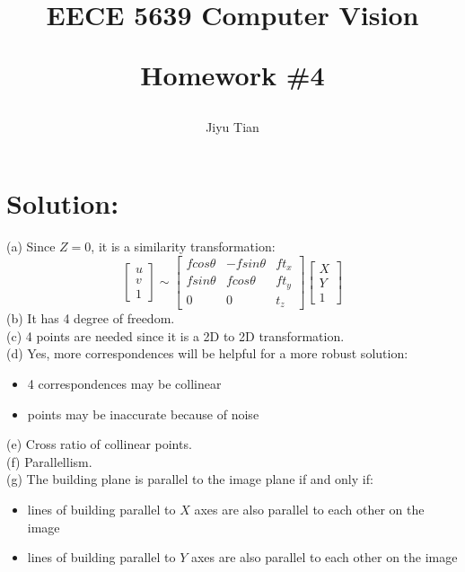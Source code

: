 \documentclass[12pt]{article}
\title{EECE 5639 Computer Vision\\ [2ex] \begin{large} Homework \#4 \end{large} }
\author{Jiyu Tian}
\date{}
\begin{document}
\maketitle
\pagestyle{empty}
\section{Solution:}
(a) Since $Z=0$, it is a similarity transformation:
\begin{equation*}
\left[ \begin{array}{c}
u\\
v\\
1
\end{array} \right] \sim \left[ \begin{array}{ccc}
fcos\theta & -fsin\theta & ft_x\\
fsin\theta & fcos\theta & ft_y\\
0 & 0 & t_z
\end{array} \right]\left[ \begin{array}{c}
X\\
Y\\
1
\end{array} \right]
\end{equation*}
(b) It has 4 degree of freedom.\\
(c) 4 points are needed since it is a 2D to 2D transformation.\\
(d) Yes, more correspondences will be helpful for a more robust solution:
\begin{itemize}
    \item 4 correspondences may be collinear
    \item points may be inaccurate because of noise
\end{itemize}
(e) Cross ratio of collinear points.\\
(f) Parallellism.\\
(g) The building plane is parallel to the image plane if and only if:
\begin{itemize}
    \item lines of building parallel to $X$ axes are also parallel to each other on the image
    \item lines of building parallel to $Y$ axes are also parallel to each other on the image
\end{itemize}

\end{document}

